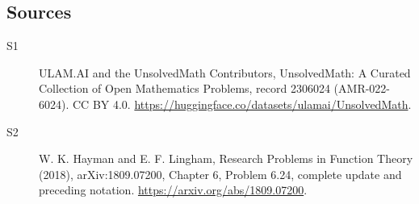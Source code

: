 \documentclass[11pt]{article}
\begin{document}
\subsection{Sources}
\begin{description}
\item[\hypertarget{source:2306024:1}{S1}] ULAM.AI and the UnsolvedMath Contributors, UnsolvedMath: A Curated Collection of Open Mathematics Problems, record 2306024 (AMR-022-6024). CC BY 4.0. \url{https://huggingface.co/datasets/ulamai/UnsolvedMath}.
\item[\hypertarget{source:2306024:2}{S2}] W. K. Hayman and E. F. Lingham, Research Problems in Function Theory (2018), arXiv:1809.07200, Chapter 6, Problem 6.24, complete update and preceding notation. \url{https://arxiv.org/abs/1809.07200}.
\end{description}
\label{end:2306024}
\end{document}

